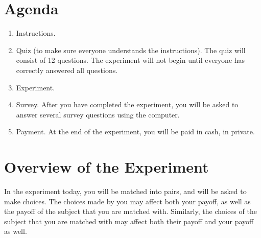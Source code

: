 \documentclass[11pt]{article}
\newcommand{\dblbkt}[1]{\ignorespaces}
\begin{document}
\section*{\dblbkt{3} Agenda}

\begin{enumerate} 
\dblbkt{1} \item Instructions.
\dblbkt{1} \item Quiz (to make sure everyone understands the instructions).  The quiz will consist of 12 questions.  The experiment will not begin until everyone has correctly answered all questions.
\dblbkt{1} \item Experiment. 
\dblbkt{1} \item Survey. After you have completed the experiment, you will be asked to answer several survey questions using the computer.  
\dblbkt{1} \item Payment. At the end of the experiment, you will be paid in cash, in private.
\end{enumerate} 


\section*{\dblbkt{3} Overview of the Experiment}

In the experiment today, you will be \dblbkt{1} matched into pairs, and will be asked to make choices.  The choices made by you may \dblbkt{1} affect both your payoff, as well as \dblbkt{1} the payoff of the subject that you are matched with.  Similarly, the choices of the subject that you are matched with may \dblbkt{1} affect both their payoff and your payoff as well.
\end{document}
